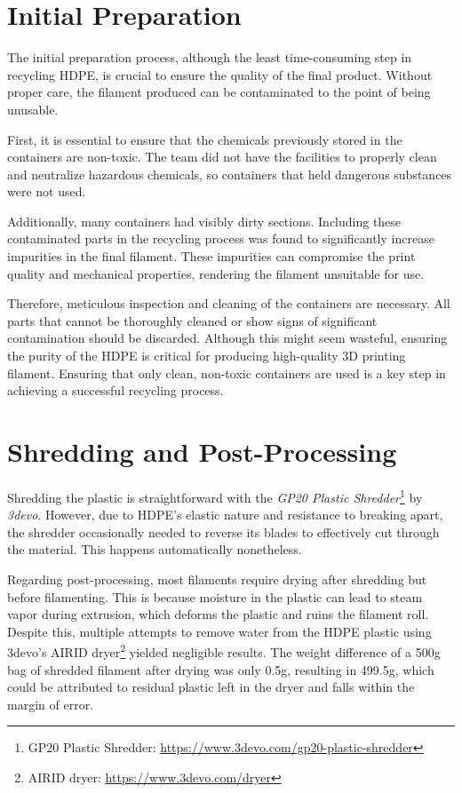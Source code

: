 \section{Initial Preparation}

The initial preparation process, although the least time-consuming step in recycling HDPE, is 
crucial to ensure the quality of the final product. Without proper care, the filament produced can 
be contaminated to the point of being unusable.

First, it is essential to ensure that the chemicals previously stored in the containers are 
non-toxic. The team did not have the facilities to properly clean and neutralize hazardous 
chemicals, so containers that held dangerous substances were not used.

Additionally, many containers had visibly dirty sections. Including these contaminated parts in 
the recycling process was found to significantly increase impurities in the final filament. These 
impurities can compromise the print quality and mechanical properties, rendering the filament 
unsuitable for use.

Therefore, meticulous inspection and cleaning of the containers are necessary. All parts that 
cannot be thoroughly cleaned or show signs of significant contamination should be discarded. 
Although this might seem wasteful, ensuring the purity of the HDPE is critical for producing 
high-quality 3D printing filament. Ensuring that only clean, non-toxic containers are used is a 
key step in achieving a successful recycling process.

\section{Shredding and Post-Processing}

Shredding the plastic is straightforward with the \textit{GP20 Plastic Shredder}\footnote{GP20 
Plastic Shredder: \url{https://www.3devo.com/gp20-plastic-shredder}} by \textit{3devo}. However, 
due to HDPE's elastic nature and resistance to breaking apart, the shredder occasionally needed to 
reverse its blades to effectively cut through the material. This happens automatically nonetheless.

Regarding post-processing, most filaments require drying after shredding but before filamenting. 
This is because moisture in the plastic can lead to steam vapor during extrusion, which deforms 
the plastic and ruins the filament roll. Despite this, multiple attempts to remove water from the 
HDPE plastic using 3devo's AIRID dryer\footnote{AIRID dryer: \url{https://www.3devo.com/dryer}} 
yielded negligible results. The weight difference of a 500g bag of shredded filament after drying 
was only 0.5g, resulting in 499.5g, which could be attributed to residual plastic left in the 
dryer and falls within the margin of error.

